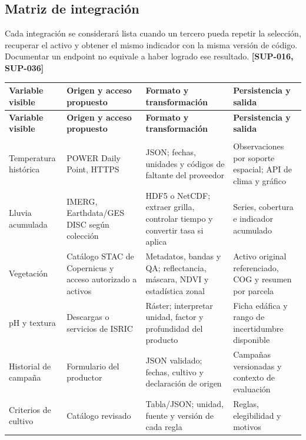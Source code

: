 \documentclass[10pt,a4paper]{article}
\begin{document}
\subsection{Matriz de integración}

Cada integración se considerará lista cuando un tercero pueda repetir la selección, recuperar el activo y obtener el mismo indicador con la misma versión de código. Documentar un endpoint no equivale a haber logrado ese resultado. \textbf{[SUP-016, SUP-036]}


\begingroup\small
\begin{longtable}{>{\raggedright\arraybackslash}p{3.115cm}>{\raggedright\arraybackslash}p{3.582cm}>{\raggedright\arraybackslash}p{4.517cm}>{\raggedright\arraybackslash}p{4.361cm}}
\toprule
\textbf{Variable visible} & \textbf{Origen y acceso propuesto} & \textbf{Formato y transformación} & \textbf{Persistencia y salida} \\
\midrule\endfirsthead
\toprule
\textbf{Variable visible} & \textbf{Origen y acceso propuesto} & \textbf{Formato y transformación} & \textbf{Persistencia y salida} \\
\midrule\endhead
\midrule\multicolumn{4}{r}{\scriptsize Continúa en la página siguiente}\\\endfoot
\bottomrule\endlastfoot
Temperatura histórica & POWER Daily Point, HTTPS & JSON; fechas, unidades y códigos de faltante del proveedor & Observaciones por soporte espacial; API de clima y gráfico \\[3pt]
Lluvia acumulada & IMERG, Earthdata/\allowbreak{}GES DISC según colección & HDF5 o NetCDF; extraer grilla, controlar tiempo y convertir tasa si aplica & Series, cobertura e indicador acumulado \\[3pt]
Vegetación & Catálogo STAC de Copernicus y acceso autorizado a activos & Metadatos, bandas y QA; reflectancia, máscara, NDVI y estadística zonal & Activo original referenciado, COG y resumen por parcela \\[3pt]
pH y textura & Descargas o servicios de ISRIC & Ráster; interpretar unidad, factor y profundidad del producto & Ficha edáfica y rango de incertidumbre disponible \\[3pt]
Historial de campaña & Formulario del productor & JSON validado; fechas, cultivo y declaración de origen & Campañas versionadas y contexto de evaluación \\[3pt]
Criterios de cultivo & Catálogo revisado & Tabla/\allowbreak{}JSON; unidad, fuente y versión de cada regla & Reglas, elegibilidad y motivos \\[3pt]
\end{longtable}
\endgroup
\end{document}
